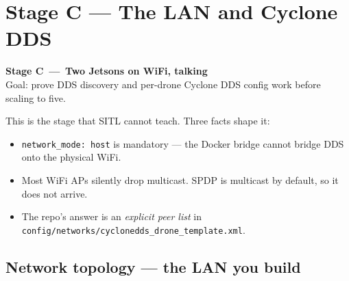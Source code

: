 \documentclass[11pt,a4paper]{article}
\newcommand{\stagebanner}[3]{%
  \begin{tcolorbox}[colback=stagebg, colframe=stagerule, boxrule=1pt, arc=3pt,
                    left=0.6cm, right=0.6cm, top=0.4cm, bottom=0.4cm,
                    fontupper=\large]
  \textbf{Stage #1 \,---\, #2}\\[2pt]
  \small\textcolor{linegrey}{Goal: #3}
  \end{tcolorbox}%
}
\begin{document}
\newpage

\section{Stage C --- The LAN and Cyclone DDS}
\stagebanner{C}{Two Jetsons on WiFi, talking}{prove DDS discovery and per-drone Cyclone DDS config work before scaling to five.}

\noindent This is the stage that SITL cannot teach. Three facts shape it:
\begin{itemize}[leftmargin=*, itemsep=1pt]
  \item \texttt{network\_mode: host} is mandatory --- the Docker bridge cannot bridge DDS onto the physical WiFi.
  \item Most WiFi APs silently drop multicast. SPDP is multicast by default, so it does not arrive.
  \item The repo's answer is an \emph{explicit peer list} in \texttt{config/networks/cyclonedds\_drone\_template.xml}.
\end{itemize}

\subsection{Network topology --- the LAN you build}
\end{document}
